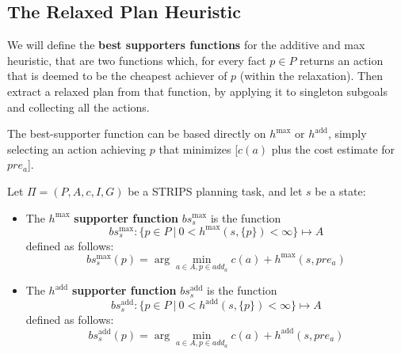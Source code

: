 \documentclass[10pt, letterpaper]{report}
\begin{document}
\subsection{The Relaxed Plan Heuristic}
We will define the \textbf{best supporters functions} for the additive and max heuristic, that are two functions which, for every fact $p\in P$  returns an action that is deemed to be the cheapest achiever of $p$
 (within the relaxation). Then extract a relaxed plan from that function,
 by applying it to singleton subgoals and collecting all the actions.\bigskip

 The best-supporter function can be based directly on $h^{\max}$ or $h^{\text{add}}$,
 simply selecting an action achieving $p$ that minimizes [$c(a)$ plus the
 cost estimate for $pre_a$].
\begin{definition}
    Let $\Pi=(P,A,c,I,G)$ be a STRIPS planning task, and let $s$ be a state:\begin{itemize}
        \item The $h^{\max}$ \textbf{supporter function} $bs_s^{\max}$ is the function \begin{equation}
            bs_s^{\max} : \{p\in P \ | \ 0<h^{\max}(s,\{p\})<\infty\}\mapsto A
        \end{equation}
        defined as follows:\begin{equation}
            bs_s^{\max}(p)=\arg\min_{
                a\in A, p\in add_a
            }c(a)+h^{\max}(s,pre_a)
        \end{equation}
        \item The $h^{\text{add}}$ \textbf{supporter function} $bs_s^{\text{add}}$ is the function \begin{equation}
            bs_s^{\text{add}} : \{p\in P \ | \ 0<h^{\text{add}}(s,\{p\})<\infty\}\mapsto A
        \end{equation}
        defined as follows:\begin{equation}
            bs_s^{\text{add}}(p)=\arg\min_{
                a\in A, p\in add_a
            }c(a)+h^{\text{add}}(s,pre_a)
        \end{equation}
    \end{itemize}
\end{definition}
\end{document}
